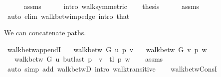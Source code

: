 \begin{isabellebody}
\ \ \ \ \isamarkupfalse%
\ assms{\isacharparenleft}{\kern0pt}{}{\isacharparenright}{\kern0pt}\isanewline
\ \ \ \ \isamarkupfalse%
\ {\isacharparenleft}{\kern0pt}intro\ walk{\isacharunderscore}{\kern0pt}symmetric{\isacharparenright}{\kern0pt}\isanewline
\ \ \isamarkupfalse%
\ {\isacharquery}{\kern0pt}thesis\isanewline
\ \ \ \ \isamarkupfalse%
\ assms{\isacharparenleft}{\kern0pt}{}{\isacharparenright}{\kern0pt}\isanewline
\ \ \ \ \isamarkupfalse%
\ {\isacharparenleft}{\kern0pt}auto\ elim{\isacharcolon}{\kern0pt}\ walk{\isacharunderscore}{\kern0pt}betw{\isacharunderscore}{\kern0pt}imp{\isacharunderscore}{\kern0pt}edge\ intro{\isacharcolon}{\kern0pt}\ that{\isacharparenright}{\kern0pt}\isanewline
{}\isamarkupfalse%
%
\endisatagproof
{\isafoldproof}%
%
\isadelimproof
%
\endisadelimproof
%
\begin{isamarkuptext}%
We can concatenate paths.%
\end{isamarkuptext}\isamarkuptrue%
\isamarkupfalse%
\ walk{\isacharunderscore}{\kern0pt}betw{\isacharunderscore}{\kern0pt}appendI{\isacharcolon}{\kern0pt}\isanewline
\ \ \ {\isachardoublequoteopen}walk{\isacharunderscore}{\kern0pt}betw\ G\ u\ p\ v{\isachardoublequoteclose}\isanewline
\ \ \ {\isachardoublequoteopen}walk{\isacharunderscore}{\kern0pt}betw\ G\ v\ p{\isacharprime}{\kern0pt}\ w{\isachardoublequoteclose}\isanewline
\ \ \ {\isachardoublequoteopen}walk{\isacharunderscore}{\kern0pt}betw\ G\ u\ {\isacharparenleft}{\kern0pt}{\isacharparenleft}{\kern0pt}butlast\ p\ {\isacharat}{\kern0pt}\ {\isacharbrackleft}{\kern0pt}v{\isacharbrackright}{\kern0pt}{\isacharparenright}{\kern0pt}\ {\isacharat}{\kern0pt}\ tl\ p{\isacharprime}{\kern0pt}{\isacharparenright}{\kern0pt}\ w{\isachardoublequoteclose}\isanewline
%
\isadelimproof
\ \ %
\endisadelimproof
%
\isatagproof
{}\isamarkupfalse%
\ assms\isanewline
\ \ \isamarkupfalse%
\ {\isacharparenleft}{\kern0pt}auto\ simp\ add{\isacharcolon}{\kern0pt}\ walk{\isacharunderscore}{\kern0pt}betwD{\isacharparenleft}{\kern0pt}{}{\isacharparenright}{\kern0pt}\ intro{\isacharcolon}{\kern0pt}\ walk{\isacharunderscore}{\kern0pt}transitive{\isacharparenright}{\kern0pt}%
\endisatagproof
{\isafoldproof}%
%
\isadelimproof
\isanewline
%
\endisadelimproof
%
\isadeliminvisible
\ \ \isanewline
%
\endisadeliminvisible
%
\isataginvisible
{}\isamarkupfalse%
\ walk{\isacharunderscore}{\kern0pt}betw{\isacharunderscore}{\kern0pt}ConsI{\isacharcolon}{\kern0pt}\isanewline

\end{isabellebody}
